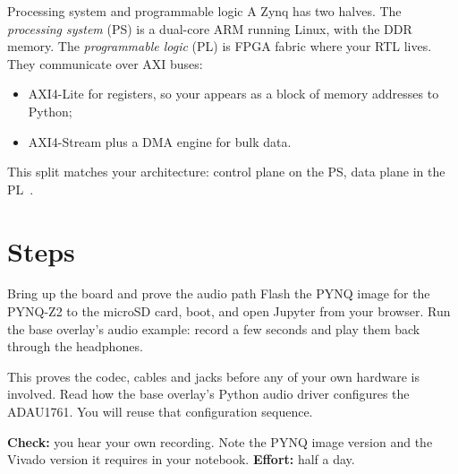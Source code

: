 \begin{conceptbox}{Processing system and programmable logic}
A Zynq has two halves. The \emph{processing system} (PS) is a dual-core ARM
running Linux, with the DDR memory. The \emph{programmable logic} (PL) is FPGA
fabric where your RTL lives. They communicate over AXI buses:
\begin{itemize}
  \item AXI4-Lite for registers, so your  appears as a block of
        memory addresses to Python;
  \item AXI4-Stream plus a DMA engine for bulk data.
\end{itemize}
This split matches your architecture: control plane on the PS, data plane in
the PL~\cite{ch12-13:crockett2014zynq}.
\end{conceptbox}

\section{Steps}\label{sec:fpga:steps}

\begin{stepbox}[label=st:fpga:boot]{Bring up the board and prove the audio path}
Flash the PYNQ image for the PYNQ-Z2 to the microSD card, boot, and open
Jupyter from your browser. Run the base overlay's audio example: record a few
seconds and play them back through the headphones.

This proves the codec, cables and jacks before any of your own hardware is
involved. Read how the base overlay's Python audio driver configures the
ADAU1761. You will reuse that configuration sequence.

\textbf{Check:} you hear your own recording. Note the PYNQ image version and
the Vivado version it requires in your notebook. \textbf{Effort:} half a day.
\end{stepbox}

